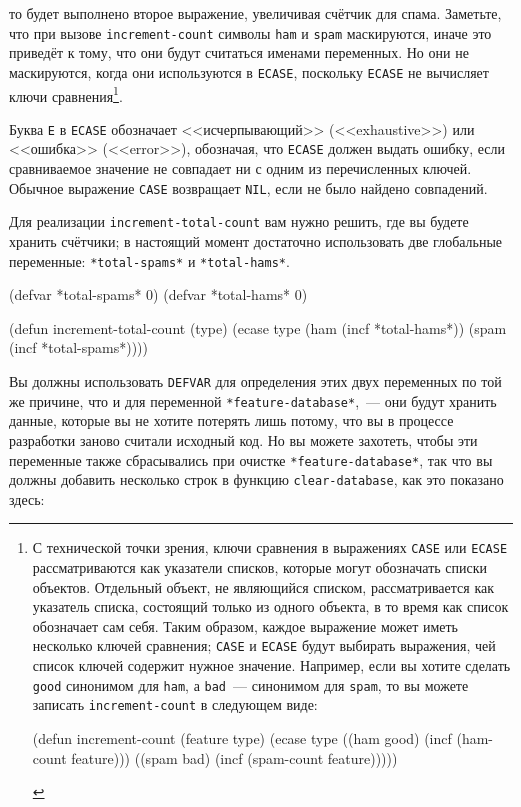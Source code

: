 \noindent{}то будет выполнено второе выражение, увеличивая счётчик для спама.  Заметьте, что при
вызове \lstinline{increment-count} символы \lstinline{ham} и \lstinline{spam} маскируются, иначе это
приведёт к тому, что они будут считаться именами переменных.  Но они не маскируются, когда
они используются в \lstinline{ECASE}, поскольку \lstinline{ECASE} не вычисляет ключи
сравнения\footnote{С технической точки зрения, ключи сравнения в выражениях \lstinline{CASE}
  или \lstinline{ECASE} рассматриваются как указатели списков, которые могут обозначать списки
  объектов.  Отдельный объект, не являющийся списком, рассматривается как указатель
  списка, состоящий только из одного объекта, в то время как список обозначает сам себя.
  Таким образом, каждое выражение может иметь несколько ключей сравнения; \lstinline{CASE} и
  \lstinline{ECASE} будут выбирать выражения, чей список ключей содержит нужное значение.
  Например, если вы хотите сделать \lstinline{good} синонимом для \lstinline{ham}, а \lstinline{bad}~---
  синонимом для \lstinline{spam}, то вы можете записать \lstinline{increment-count} в следующем
  виде:

\begin{myverb}
(defun increment-count (feature type)
  (ecase type
    ((ham good) (incf (ham-count feature)))
    ((spam bad) (incf (spam-count feature)))))
\end{myverb}
}\hspace{\footnotenegspace}.

Буква \lstinline{E} в \lstinline{ECASE} обозначает <<исчерпывающий>> (<<exhaustive>>) или
<<ошибка>> (<<error>>), обозначая, что \lstinline{ECASE} должен выдать ошибку, если сравниваемое
значение не совпадает ни с одним из перечисленных ключей.  Обычное выражение \lstinline{CASE}
возвращает \lstinline{NIL}, если не было найдено совпадений.

Для реализации \lstinline{increment-total-count} вам нужно решить, где вы будете хранить
счётчики; в настоящий момент достаточно использовать две глобальные переменные:
\lstinline{*total-spams*} и \lstinline{*total-hams*}.

\begin{myverb}
(defvar *total-spams* 0)
(defvar *total-hams* 0)

(defun increment-total-count (type)
  (ecase type
    (ham (incf *total-hams*))
    (spam (incf *total-spams*))))
\end{myverb}

Вы должны использовать \lstinline{DEFVAR} для определения этих двух переменных по той же
причине, что и для переменной \lstinline{*feature-database*},~--- они будут хранить данные,
которые вы не хотите потерять лишь потому, что вы в процессе разработки заново считали
исходный код.  Но вы можете захотеть, чтобы эти переменные также сбрасывались при очистке
\lstinline{*feature-database*}, так что вы должны добавить несколько строк в функцию
\lstinline{clear-database}, как это показано здесь:

